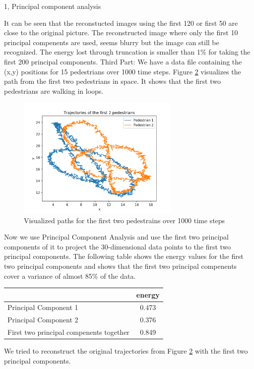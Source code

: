 \documentclass[10pt,a4paper]{article}
\begin{document}
\begin{task}{1, Principal component analysis}
\begin{figure}[H]
\label{fig:task1_part2}
\end{figure}
It can be seen that the reconstucted images using the first 120 or first 50 are close to the original picture. The reconstructed image where only the first 10 principal compenents are used, seems blurry but the image can still be recognized.
The energy lost through truncation is smaller than 1\% for taking the first 200 principal components.
\bigbreak
Third Part: We have a data file containing the (x,y) positions for 15 pedestrians over 1000 time steps. Figure \ref{fig:task1_part3_1} visualizes the path from the first two pedestrians in space. It shows that the first two pedestrians are walking in loops.
\begin{figure}[H]
\centering
\includegraphics[width=0.7\textwidth]{../plots/task1/task1_3.png}
\caption{Visualized paths for the first two pedestrains over 1000 time steps}
\label{fig:task1_part3_1}
\end{figure}
Now we use Principal Component Analysis and use the first two principal components of it to project the 30-dimensional data points to the first two principal components. The following table shows the energy values for the  first two principal components and shows that the first two principal compenents cover a variance of almost 85\% of the data.
\begin{center}
\begin{tabular}{l|c}
& energy\\
\hline
Principal Component 1& 0.473\\
Principal Component 2& 0.376\\
First two  principal compenents together&0.849\\
\hline
\end{tabular}
\end{center}
We tried to reconstruct the original trajectories from Figure \ref{fig:task1_part3_1} with the first two principal components.

\end{task}
\end{document}
